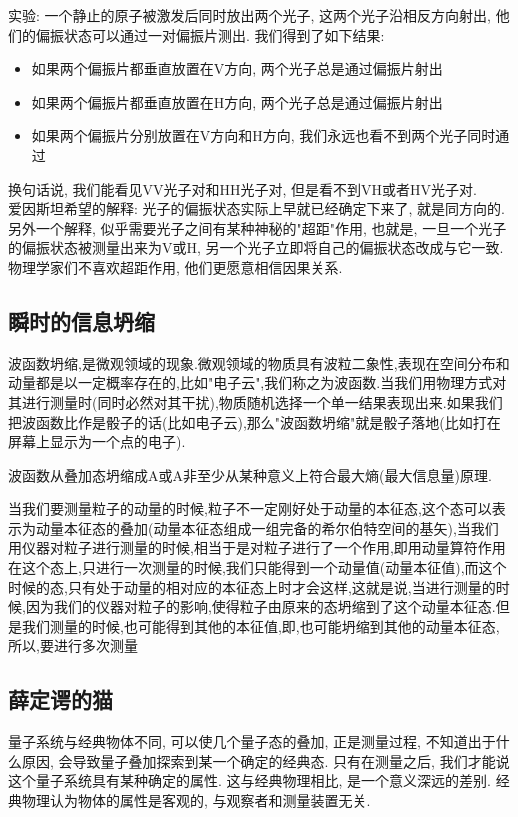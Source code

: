 实验: 一个静止的原子被激发后同时放出两个光子, 这两个光子沿相反方向射出, 他们的偏振状态可以通过一对偏振片测出. 我们得到了如下结果:
\begin{itemize}
	\item 如果两个偏振片都垂直放置在V方向, 两个光子总是通过偏振片射出
	\item 如果两个偏振片都垂直放置在H方向, 两个光子总是通过偏振片射出
	\item 如果两个偏振片分别放置在V方向和H方向, 我们永远也看不到两个光子同时通过
\end{itemize}
换句话说, 我们能看见VV光子对和HH光子对, 但是看不到VH或者HV光子对.\\
爱因斯坦希望的解释: 光子的偏振状态实际上早就已经确定下来了, 就是同方向的.\\
另外一个解释, 似乎需要光子之间有某种神秘的"超距"作用, 也就是, 一旦一个光子的偏振状态被测量出来为V或H, 另一个光子立即将自己的偏振状态改成与它一致.\\
物理学家们不喜欢超距作用, 他们更愿意相信因果关系.

\subsection{瞬时的信息坍缩}
波函数坍缩,是微观领域的现象.微观领域的物质具有波粒二象性,表现在空间分布和动量都是以一定概率存在的,比如"电子云",我们称之为波函数.当我们用物理方式对其进行测量时(同时必然对其干扰),物质随机选择一个单一结果表现出来.如果我们把波函数比作是骰子的话(比如电子云),那么"波函数坍缩"就是骰子落地(比如打在屏幕上显示为一个点的电子).\par
波函数从叠加态坍缩成A或A非至少从某种意义上符合最大熵(最大信息量)原理.\par
当我们要测量粒子的动量的时候,粒子不一定刚好处于动量的本征态,这个态可以表示为动量本征态的叠加(动量本征态组成一组完备的希尔伯特空间的基矢),当我们用仪器对粒子进行测量的时候,相当于是对粒子进行了一个作用,即用动量算符作用在这个态上,只进行一次测量的时候,我们只能得到一个动量值(动量本征值),而这个时候的态,只有处于动量的相对应的本征态上时才会这样,这就是说,当进行测量的时候,因为我们的仪器对粒子的影响,使得粒子由原来的态坍缩到了这个动量本征态.但是我们测量的时候,也可能得到其他的本征值,即,也可能坍缩到其他的动量本征态,所以,要进行多次测量

\subsection{薛定谔的猫}
量子系统与经典物体不同, 可以使几个量子态的叠加, 正是测量过程, 不知道出于什么原因, 会导致量子叠加探索到某一个确定的经典态.
只有在测量之后, 我们才能说这个量子系统具有某种确定的属性.
这与经典物理相比, 是一个意义深远的差别. 经典物理认为物体的属性是客观的, 与观察者和测量装置无关.

